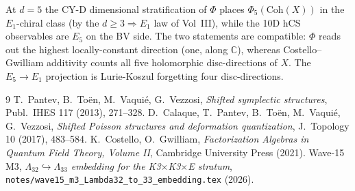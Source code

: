 \documentclass[11pt]{amsart}
\providecommand{\C}{\mathbb{C}}
\theoremstyle{plain}
\theoremstyle{definition}
\begin{document}
At $d=5$ the CY-D dimensional stratification of $\Phi$ places
$\Phi_5(\mathrm{Coh}(X))$ in the $E_1$-chiral class (by the
$d \geq 3 \Rightarrow E_1$ law of Vol~III), while the 10D hCS
observables are $E_5$ on the BV side. The two statements are
compatible: $\Phi$ reads out the highest locally-constant direction
(one, along $\C$), whereas Costello--Gwilliam additivity counts all
five holomorphic disc-directions of $X$. The $E_5 \to E_1$ projection
is Lurie-Koszul forgetting four disc-directions.

\begin{thebibliography}{9}
 T.~Pantev, B.~To\"en, M.~Vaqui\'e, G.~Vezzosi,
  \emph{Shifted symplectic structures}, Publ.~IHES 117 (2013),
  271--328.
 D.~Calaque, T.~Pantev, B.~To\"en, M.~Vaqui\'e,
  G.~Vezzosi, \emph{Shifted Poisson structures and deformation
  quantization}, J.~Topology 10 (2017), 483--584.
 K.~Costello, O.~Gwilliam, \emph{Factorization
  Algebras in Quantum Field Theory, Volume II}, Cambridge University
  Press (2021).
 Wave-15 M3, \emph{$\Lambda_{32} \hookrightarrow
  \Lambda_{33}$ embedding for the K3$\times$K3$\times$E stratum},
  \texttt{notes/wave15\_m3\_Lambda32\_to\_33\_embedding.tex} (2026).
\end{thebibliography}
\end{document}
